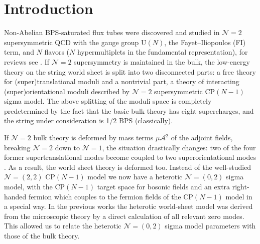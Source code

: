\documentclass[12pt]{article}
\newcommand{\ntwo}{${\mathcal N}=2$ }
\newcommand{\ntwoo}{${\mathcal N}= \left(0,2\right) $ }
\newcommand{\nonen}{${\mathcal N}=1$}
\begin{document}
\begin{titlepage}
\begin{abstract}
 

\end{abstract}

\end{titlepage}

\section{Introduction}

Non-Abelian BPS-saturated flux tubes were discovered \cite{HT1,ABEKY} and studied 
\cite{SYmon,Tong,HT2} in \ntwo super\-symmetric QCD with the gauge group
U$(N)$, the Fayet--Iliopoulos (FI) term,
and $N$ flavors ($N$ hypermultiplets in the fundamental representation),
for reviews see \cite{Trev,Jrev,SYrev,Trev2}.
If \ntwo supersymmetry is maintained in the bulk,
the low-energy theory on the
string world sheet is split into two disconnected parts:
a free theory for (super)translational moduli and a nontrivial part, a theory of
interacting (super)orientational moduli described by \ntwo supersymmetric CP$(N-1)$ 
sigma model.  The above splitting of the moduli space
 is completely predetermined by the fact
that the basic bulk theory has eight supercharges, and the string under consideration
is 1/2 BPS (classically). 

If \ntwo bulk theory is deformed by mass terms $\mu{\mathcal A}^2$ of the adjoint fields,
breaking \ntwo down to \nonen, the situation drastically changes:
two of the four former supertranslational modes
become coupled to two superorientational modes \cite{Edalati}.
As a result, the world sheet theory is deformed too.
Instead of the well-studied ${\mathcal N}=(2,2)$ CP$(N-1)$ model we now have
a heterotic \ntwoo 
sigma model, with the CP$(N-1)$ target space for bosonic fields and an extra 
right-handed fermion which couples to the fermion fields of the
CP$(N-1)$ model in a special way. In the previous works \cite{SYhet,BSYhet}
the heterotic world-sheet model was derived from the microscopic theory by
a direct calculation of all relevant zero modes.
This allowed us 
to relate the  heterotic \ntwoo 
sigma model parameters with those of the bulk theory.
\end{document}
